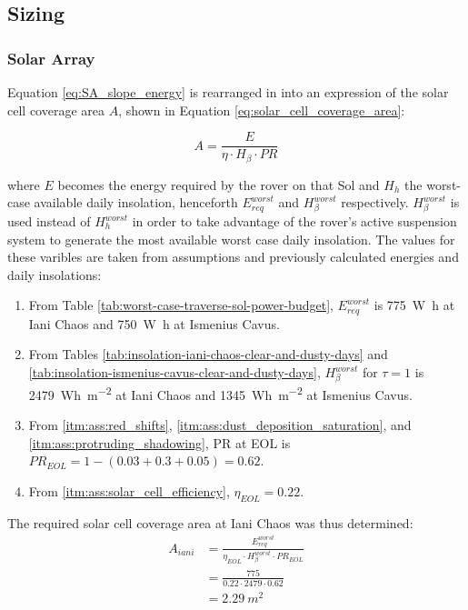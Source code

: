 
\subsection{Sizing}

\subsubsection{Solar Array}
Equation \ref{eq:SA_slope_energy} is rearranged in into an expression of the solar cell coverage area $A$, shown in Equation \ref{eq:solar_cell_coverage_area}:

\begin{equation}
  \label{eq:solar_cell_coverage_area}
  A = \frac{E}{\eta \cdot H_{\beta} \cdot PR}
\end{equation}

where $E$ becomes the energy required by the rover on that Sol and $H_{h}$ the worst-case available daily insolation, henceforth $E_{req}^{worst}$ and $H_{\beta}^{worst}$ respectively. $H_{\beta}^{worst}$ is used instead of $H_{h}^{worst}$ in order to take advantage of the rover's active suspension system to generate the most available worst case daily insolation. The values for these varibles are taken from assumptions and previously calculated energies and daily insolations:

\begin{enumerate}[label=\textbf{\textcolor{BulletBlue}{(\alph*)}}]
    \item From Table \ref{tab:worst-case-traverse-sol-power-budget}, $E_{req}^{worst}$ is \SI{775}{\watt\hour} at Iani Chaos and \SI{750}{\watt\hour} at Ismenius Cavus.
    \item From Tables \ref{tab:insolation-iani-chaos-clear-and-dusty-days} and \ref{tab:insolation-ismenius-cavus-clear-and-dusty-days}, $H_{\beta}^{worst}$ for $\tau=1$ is \SI{2479}{Wh.m^{-2}} at Iani Chaos and \SI{1345}{Wh.m^{-2}} at Ismenius Cavus.
    \item From \ref{itm:ass:red_shifts}, \ref{itm:ass:dust_deposition_saturation}, and \ref{itm:ass:protruding_shadowing}, \ac{PR} at \ac{EOL} is $PR_{EOL} = 1 - (0.03 + 0.3 + 0.05) = 0.62$.
    \item From \ref{itm:ass:solar_cell_efficiency}, $\eta_{EOL} = 0.22$.
\end{enumerate}


The required solar cell coverage area at Iani Chaos was thus determined:
\begin{align}
  \label{calc:solar_cell_area_iani_chaos}
  A_{iani} &= \frac{E_{req}^{worst}}{\eta_{EOL} \cdot H_{\beta}^{worst} \cdot PR_{EOL}}\\
           &= \frac{775}{0.22 \cdot 2479 \cdot 0.62}\\
           &= \SI{2.29}{m^{2}}
\end{align}

